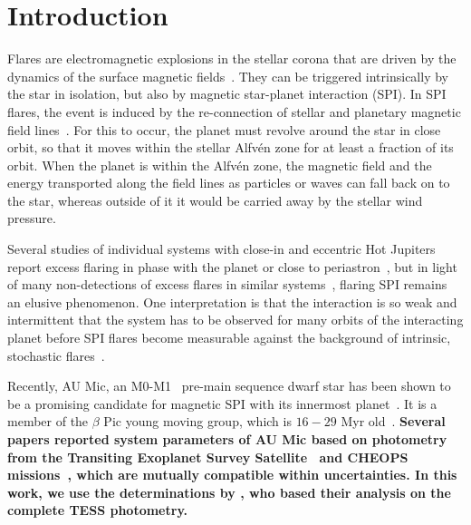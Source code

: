\documentclass[fleqn,usenatbib]{mnras}%
\begin{document}
\section{Introduction}

Flares are electromagnetic explosions in the stellar corona that are driven by the dynamics of the surface magnetic fields~\citep{benz2010}. They can be triggered intrinsically by the star in isolation, but also by magnetic star-planet interaction (SPI). In SPI flares, the event is induced by the re-connection of stellar and planetary magnetic field lines~\citep{saur2013magnetic,lanza2018close-by,fischer2019}. For this to occur, the planet must revolve around the star in close orbit, so that it moves within the stellar Alfv\'en zone for at least a fraction of its orbit. When the planet is within the Alfv\'en zone, the magnetic field and the energy transported along the field lines as particles or waves can fall back on to the star, whereas outside of it it would be carried away by the stellar wind pressure. 

Several studies of individual systems with close-in and eccentric Hot Jupiters report excess flaring in phase with the planet or close to periastron~\citep{shkolnik2005,pillitteri2011,maggio2015}, but in light of many non-detections of excess flares in similar systems~\citep{figueira2016, fischer2019}, flaring SPI remains an elusive phenomenon. One interpretation is that the interaction is so weak and intermittent that the system has to be observed for many orbits of the interacting planet before SPI flares become measurable against the background of intrinsic, stochastic flares~\citep{shkolnik2008,lanza2009,saur2013magnetic,strugarek2015}.

Recently, AU Mic, an M0-M1~\citep{pecaut2013,gaidos2014} pre-main sequence dwarf star has been shown to be a promising candidate for magnetic SPI with its innermost planet~\citep{kavanagh2021}. It is a member of the $\beta$ Pic young moving group, which is $16-29$ Myr old~\citep{malo2014,binks2014,mamajek2014,bell2015,binks2016,shkolnik2017,miretroig2020}. \textbf{Several papers reported system parameters of AU Mic based on photometry from the Transiting Exoplanet Survey Satellite~\citep[TESS,][]{ricker2014} and CHEOPS~\citep{benz2021cheops} missions~\citep{plavchan2020, martioli2021new, szabo2021changing, gilbert2021flares,cale2021diving}, which are mutually compatible within uncertainties. In this work, we use the determinations by \citet{gilbert2021flares}, who based their analysis on the complete TESS photometry.}
\end{document}
